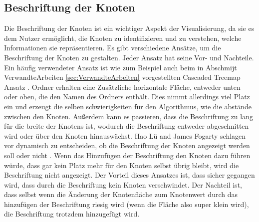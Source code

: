 \subsection{Beschriftung der Knoten} \label{sec:BeschriftungKnoten}
Die Beschriftung der Knoten ist ein wichtiger Aspekt der Visualisierung, da sie es dem Nutzer ermöglicht, die Knoten zu identifizieren und zu verstehen, welche Informationen sie repräsentieren. Es gibt verschiedene Ansätze, um die Beschriftung der Knoten zu gestalten. Jeder Ansatz hat seine Vor- und Nachteile. Ein häufig verwendeter Ansatz ist wie zum Beispiel auch beim in Abschmijt VerwandteArbeiten \ref{sec:VerwandteArbeiten} vorgestellten Cascaded Treemap Ansatz \cite{lu2008cascaded}.
Ordner erhalten eine Zusätzliche horizontale Fläche, entweder unten oder oben, die den Namen des Ordners enthält. 
Dies nimmt allerdings viel Platz ein und erzeugt die selben schwierigkeiten für den Algorithmus, wie die abstände zwischen den Knoten. Außerdem kann es passieren, dass die Beschriftung zu lang für die breite der Knotens ist, wodurch die Beschriftung entweder abgeschnitten wird oder über den Knoten hinauswächst.
Hao Lü and James Fogarty schlagen vor dynamisch zu entscheiden, ob die Beschriftung der Knoten angezeigt werden soll oder nicht \cite{lu2008cascaded}. Wenn das Hinzufügen der Beschriftung den Knoten dazu führen würde, dass gar kein Platz mehr für den Knoten selbst übrig bleibt, wird die Beschriftung nicht angezeigt. Der Vorteil dieses Ansatzes ist, dass sicher gegangen wird, dass durch die Beschriftung kein Knoten verschwindet. Der Nachteil ist, dass selbst wenn die Änderung der Knotenfläche zum Knotenwert durch das hinzufügen der Beschriftung riesig wird (wenn die Fläche also super klein wird), die Beschriftung trotzdem hinzugefügt wird. 



